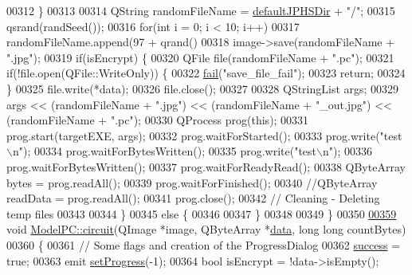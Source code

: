 \begin{DoxyCode}
00312     \}
00313 
00314     QString randomFileName = \hyperlink{class_model_p_c_abd038306f14f22fb885a1697c96d6335}{defaultJPHSDir} + \textcolor{stringliteral}{"/"};
00315     qsrand(randSeed());
00316     \textcolor{keywordflow}{for}(\textcolor{keywordtype}{int} i = 0; i < 10; i++)
00317         randomFileName.append(97 + qrand() %
00318     image->save(randomFileName + \textcolor{stringliteral}{".jpg"});
00319     \textcolor{keywordflow}{if}(isEncrypt) \{
00320         QFile file(randomFileName + \textcolor{stringliteral}{".pc"});
00321         \textcolor{keywordflow}{if}(!file.open(QFile::WriteOnly)) \{
00322             \hyperlink{class_model_p_c_a47464b59b7e37fcee25e55475708aabd}{fail}(\textcolor{stringliteral}{"save\_file\_fail"});
00323             \textcolor{keywordflow}{return};
00324         \}
00325         file.write(*data);
00326         file.close();
00327 
00328         QStringList args;
00329         args << (randomFileName + \textcolor{stringliteral}{".jpg"}) << (randomFileName + \textcolor{stringliteral}{"\_out.jpg"}) << (randomFileName + \textcolor{stringliteral}{".pc"});
00330         QProcess prog(\textcolor{keyword}{this});
00331         prog.start(targetEXE, args);
00332         prog.waitForStarted();
00333         prog.write(\textcolor{stringliteral}{"test\(\backslash\)n"});
00334         prog.waitForBytesWritten();
00335         prog.write(\textcolor{stringliteral}{"test\(\backslash\)n"});
00336         prog.waitForBytesWritten();
00337         prog.waitForReadyRead();
00338         QByteArray bytes = prog.readAll();
00339         prog.waitForFinished();
00340         \textcolor{comment}{//QByteArray readData = prog.readAll();}
00341         prog.close();
00342         \textcolor{comment}{// Cleaning - Deleting temp files}
00343 
00344     \}
00345     \textcolor{keywordflow}{else} \{
00346 
00347     \}
00348 
00349 \}
00350 
\hypertarget{modelpc_8cpp_source.tex_l00359}{}\hyperlink{class_model_p_c_a1d0091062a0c836b283ec2f67411623b}{00359} \textcolor{keywordtype}{void} \hyperlink{class_model_p_c_a1d0091062a0c836b283ec2f67411623b}{ModelPC::circuit}(QImage *image, QByteArray *\hyperlink{namespace_errors_dict_setup_af570460846fb9f0c91abd308a095dcdc}{data}, \textcolor{keywordtype}{long} \textcolor{keywordtype}{long} countBytes)
00360 \{
00361     \textcolor{comment}{// Some flags and creation of the ProgressDialog}
00362     \hyperlink{class_model_p_c_a945ffbbc44a832b953c191debd448f4c}{success} = \textcolor{keyword}{true};
00363     emit \hyperlink{class_model_p_c_afdcd80f0ed5062e145a71f09b0897547}{setProgress}(-1);
00364     \textcolor{keywordtype}{bool} isEncrypt = !data->isEmpty();

\end{DoxyCode}

